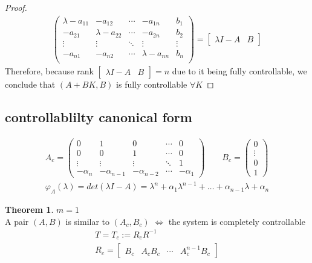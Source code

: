 \documentclass{book}
\theoremstyle{definition}
\newtheorem{theorem}{Theorem}[section]
\theoremstyle{remark}
\theoremstyle{remark}
\begin{document}
\begin{proof}
\begin{gather*}
\begin{pmatrix}
            \lambda-a_{11} & -a_{12}& \cdots & -a_{1n} & b_1\\
            -a_{21} & \lambda-a_{22}& \cdots & -a_{2n} & b_2\\
            \vdots & \vdots & \ddots & \vdots & \vdots\\
            -a_{n1} & -a_{n2}& \cdots & \lambda-a_{nn} & b_n\\
        \end{pmatrix}=\begin{bmatrix}
            \lambda I -A & B
        \end{bmatrix}
    \end{gather*}
    Therefore, because rank \( \begin{bmatrix}
        \lambda I -A & B
    \end{bmatrix}=n \) due to it being fully controllable, we conclude that \((A+BK,B)\) is fully controllable $\forall K$
\end{proof}
\subsection{controllablilty canonical form}
\begin{gather*}
A_c=\begin{pmatrix}
    0 & 1 & 0 & \cdots & 0 \\
    0 & 0  & 1 & \cdots & 0 \\
    \vdots & \vdots & \vdots & \ddots & 1\\
    -\alpha_n & -\alpha_{n-1} & -\alpha_{n-2}& \cdots & -\alpha_1
\end{pmatrix} \qquad B_c=\begin{pmatrix}
    0 \\ \vdots \\ 0 \\1
\end{pmatrix} \\ \varphi_A(\lambda)=det(\lambda I-A)=\lambda^n+\alpha_1\lambda^{n-1}+\dots+\alpha_{n-1}\lambda +\alpha_n
\end{gather*}

\begin{theorem}
    $m=1$\\
    A pair $(A,B)$ is similar to $(A_c,B_c)$ $\iff$ the system is completely controllable
    \begin{gather*}
        T=T_c:=R_cR^{-1}\\
        R_c=\begin{bmatrix}
            B_c & A_cB_c & \cdots & A_c^{n-1}B_c
            \end{bmatrix}
    \end{gather*}

\end{theorem}
\end{document}
